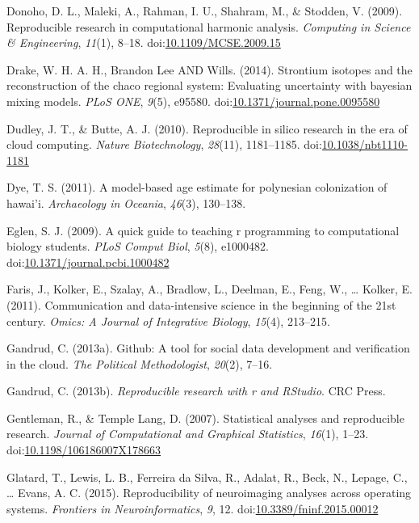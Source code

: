 \documentclass[american,man]{apa6}
\begin{document}
Donoho, D. L., Maleki, A., Rahman, I. U., Shahram, M., \& Stodden, V.
(2009). Reproducible research in computational harmonic analysis.
\emph{Computing in Science \& Engineering}, \emph{11}(1), 8--18.
doi:\href{http://dx.doi.org/10.1109/MCSE.2009.15}{10.1109/MCSE.2009.15}

Drake, W. H. A. H., Brandon Lee AND Wills. (2014). Strontium isotopes
and the reconstruction of the chaco regional system: Evaluating
uncertainty with bayesian mixing models. \emph{PLoS ONE}, \emph{9}(5),
e95580.
doi:\href{http://dx.doi.org/10.1371/journal.pone.0095580}{10.1371/journal.pone.0095580}

Dudley, J. T., \& Butte, A. J. (2010). Reproducible in silico research
in the era of cloud computing. \emph{Nature Biotechnology},
\emph{28}(11), 1181--1185.
doi:\href{http://dx.doi.org/10.1038/nbt1110-1181}{10.1038/nbt1110-1181}

Dye, T. S. (2011). A model-based age estimate for polynesian
colonization of hawai'i. \emph{Archaeology in Oceania}, \emph{46}(3),
130--138.

Eglen, S. J. (2009). A quick guide to teaching r programming to
computational biology students. \emph{PLoS Comput Biol}, \emph{5}(8),
e1000482.
doi:\href{http://dx.doi.org/10.1371/journal.pcbi.1000482}{10.1371/journal.pcbi.1000482}

Faris, J., Kolker, E., Szalay, A., Bradlow, L., Deelman, E., Feng, W.,
\ldots{} Kolker, E. (2011). Communication and data-intensive science in
the beginning of the 21st century. \emph{Omics: A Journal of Integrative
Biology}, \emph{15}(4), 213--215.

Gandrud, C. (2013a). Github: A tool for social data development and
verification in the cloud. \emph{The Political Methodologist},
\emph{20}(2), 7--16.

Gandrud, C. (2013b). \emph{Reproducible research with r and RStudio}.
CRC Press.

Gentleman, R., \& Temple Lang, D. (2007). Statistical analyses and
reproducible research. \emph{Journal of Computational and Graphical
Statistics}, \emph{16}(1), 1--23.
doi:\href{http://dx.doi.org/10.1198/106186007X178663}{10.1198/106186007X178663}

Glatard, T., Lewis, L. B., Ferreira da Silva, R., Adalat, R., Beck, N.,
Lepage, C., \ldots{} Evans, A. C. (2015). Reproducibility of
neuroimaging analyses across operating systems. \emph{Frontiers in
Neuroinformatics}, \emph{9}, 12.
doi:\href{http://dx.doi.org/10.3389/fninf.2015.00012}{10.3389/fninf.2015.00012}
\end{document}
